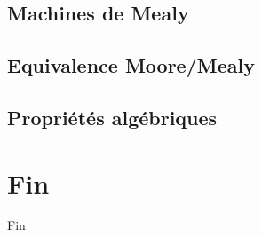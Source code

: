 \documentclass{beamer}
\begin{document}
\subsection{Machines de Mealy}

\subsection{Equivalence Moore/Mealy}

\subsection{Propriétés algébriques}

\section*{Fin}

\begin{frame}{Fin}
    
\end{frame}
\end{document}

